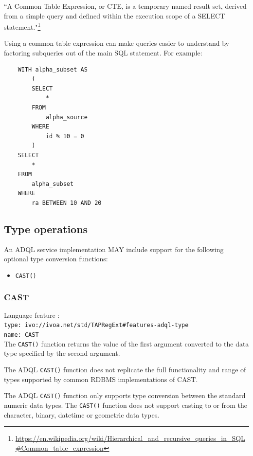 \documentclass[11pt,a4paper]{ivoa}
\begin{document}
``A Common Table Expression, or CTE, is a temporary named result set, derived
from a simple query and defined within the execution scope of a SELECT
statement."\footnote{\url{https://en.wikipedia.org/wiki/Hierarchical\_and\_recursive\_queries\_in\_SQL\#Common\_table\_expression}}

Using a common table expression can make queries easier to understand by factoring
subqueries out of the main SQL statement. For example: 

\begin{verbatim}
    WITH alpha_subset AS
        (
        SELECT
            *
        FROM
            alpha_source
        WHERE
            id % 10 = 0
        )
    SELECT
        *
    FROM
        alpha_subset
    WHERE
        ra BETWEEN 10 AND 20
\end{verbatim}

\subsection{Type operations}
\label{sec:type}

An ADQL service implementation MAY include support for the following optional
type conversion functions:

\begin{itemize}
    \item \verb:CAST():
\end{itemize}

\subsubsection{CAST}
\label{sec:type.cast}
{\footnotesize Language feature :}\\
{\footnotesize \verb|type: ivo://ivoa.net/std/TAPRegExt#features-adql-type|}\\
{\footnotesize \verb|name: CAST|}\\

The \verb:CAST(): function returns the value of the first argument converted
to the data type specified by the second argument.

The ADQL \verb:CAST(): function does not replicate the full functionality
and range of types supported by common RDBMS implementations of CAST.

The ADQL \verb:CAST(): function only supports type conversion between the
standard numeric data types. The \verb:CAST(): function does not support
casting to or from the character, binary, datetime or geometric data types.
\end{document}
